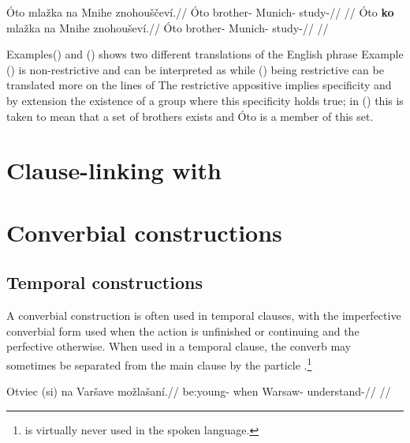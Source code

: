 \pex\a
\begingl{}
    \gla \'Oto mlažka na Mnihe znohouščev\'i.//
    \glb  \'Oto brother-  Munich- study-//
    \glft {}//
\endgl
\a\begingl{}
    \gla \'Oto \textbf{ko} mlažka na Mnihe znohoušev\'i.//
    \glb  \'Oto  brother-  Munich- study-//
    \glft {}//
\endgl
\xe

Examples() and () shows two different translations of the English phrase  Example () is non-restrictive and can be interpreted as  while () being restrictive can be translated more on the lines of  The restrictive appositive implies specificity and by extension the existence of a group where this specificity holds true; in () this is taken to mean that a set of brothers exists and \'Oto is a member of this set.

\section{Clause-linking with }

\section{Converbial constructions}\label{converbs-syntax}


\subsection{Temporal constructions}

A converbial construction is often used in temporal clauses, with the imperfective converbial form used when the action is unfinished or continuing and the perfective otherwise. When used in a temporal clause, the converb may sometimes be separated from the main clause by the particle .\footnote{ is virtually never used in the spoken language.}

\pex
\begingl
\gla Otviec (si) na Var\v{s}ave mo\v{z}la\v{s}an\'i.//
\glb be:young- when  Warsaw- understand-//
\glft {}//
\endgl
\xe


